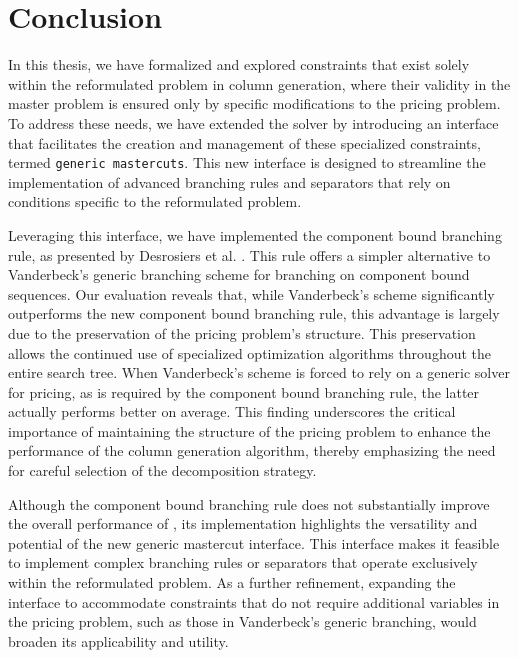 \chapter{Conclusion}\label{ch:conclusion}
In this thesis, we have formalized and explored constraints that exist solely within the reformulated problem in column generation, where their validity in the master problem is ensured only by specific modifications to the pricing problem. To address these needs, we have extended the \GCG{} solver by introducing an interface that facilitates the creation and management of these specialized constraints, termed \texttt{generic mastercuts}. This new interface is designed to streamline the implementation of advanced branching rules and separators that rely on conditions specific to the reformulated problem.

Leveraging this interface, we have implemented the component bound branching rule, as presented by Desrosiers et al. \cite{thebook}. This rule offers a simpler alternative to Vanderbeck's generic branching scheme \cite{vanderbeck2011branching} for branching on component bound sequences. Our evaluation reveals that, while Vanderbeck's scheme significantly outperforms the new component bound branching rule, this advantage is largely due to the preservation of the pricing problem's structure. This preservation allows the continued use of specialized optimization algorithms throughout the entire search tree. When Vanderbeck's scheme is forced to rely on a generic \MIP{} solver for pricing, as is required by the component bound branching rule, the latter actually performs better on average. This finding underscores the critical importance of maintaining the structure of the pricing problem to enhance the performance of the column generation algorithm, thereby emphasizing the need for careful selection of the decomposition strategy.

Although the component bound branching rule does not substantially improve the overall performance of \GCG{}, its implementation highlights the versatility and potential of the new generic mastercut interface. This interface makes it feasible to implement complex branching rules or separators that operate exclusively within the reformulated problem. As a further refinement, expanding the interface to accommodate constraints that do not require additional variables in the pricing problem, such as those in Vanderbeck's generic branching, would broaden its applicability and utility.

